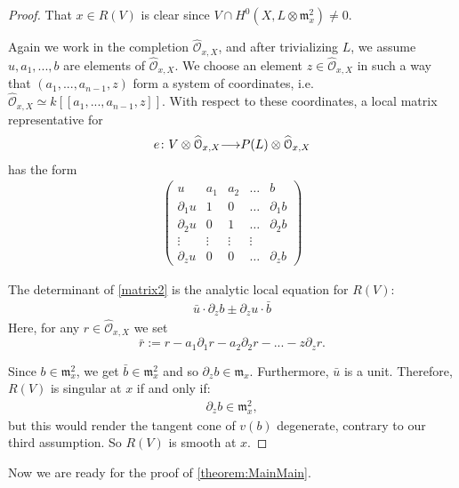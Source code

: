 \documentclass[11pt,reqno]{amsart}
\theoremstyle{plain}
\theoremstyle{definition}
\theoremstyle{remark}
\numberwithin{equation}{section}
\newcommand{\cO}{{\mathcal O}}
\renewcommand{\to}{{\longrightarrow}}
\numberwithin{equation}{section}
\begin{document}
\begin{proof}
  That $x \in R(V)$ is clear since $V \cap H^{0}(X,L \otimes \mathfrak{m}^{2}_{x}) \neq 0 $.

  Again we work in the completion $\widehat{\cO}_{x,X}$, and after trivializing $L$, we assume $u, a_{1}, ..., b$ are elements of $\widehat{\cO}_{x,X}$. We choose an element $z \in \widehat{\cO}_{x,X}$ in such a way that $(a_{1}, ..., a_{n-1}, z)$ form a system of coordinates, i.e. $\widehat{\cO}_{x,X} \simeq k[[a_{1}, ..., a_{n-1}, z ]]$.  With respect to these coordinates, a local matrix representative for \begin{align*}
  e\from V \otimes \widehat{\cO}_{x,X} \to P(L) \otimes \widehat{\cO}_{x,X}
\end{align*}
has the form
\begin{align}\label{matrix2}
\begin{pmatrix}
  u & a_{1} & a_{2} & \dots & b \\
  \partial_{1}u & 1 & 0 & \dots & \partial_{1}b \\
  \partial_{2}u & 0 & 1 & \dots & \partial_{2}b \\
  \vdots & \vdots & \vdots & \vdots \\
  \partial_{z}u  & 0 & 0 & \dots & \partial_{z}b
\end{pmatrix}
\end{align}

The determinant of \ref{matrix2} is the analytic local equation for $R(V)$: 
\begin{align*}
   \bar{u} \cdot \partial_{z}b \pm \partial_{z}u \cdot \bar{b}
 \end{align*} 
 Here, for any $r \in \widehat{\cO}_{x,X}$ we set $$\bar{r} := r - a_{1}\partial_{1}r - a_{2}\partial_{2}r - ... - z \partial_{z} r.$$

 Since $b \in {\mathfrak m}^{2}_{x}$, we get $\bar{b} \in {\mathfrak m}^{2}_{x}$ and so $\partial_{z}b \in {\mathfrak m}_{x}$.  Furthermore, $\bar{u}$ is a unit.  Therefore,  $R(V)$ is singular at $x$ if and only if: 
 \begin{align*}
  \partial_{z}b \in {\mathfrak m}^{2}_{x},
 \end{align*}
 but this would render the tangent cone of $v(b)$ degenerate, contrary to our third assumption. So $R(V)$ is smooth at $x$.
\end{proof}

Now we are ready for the proof of \autoref{theorem:MainMain}. 
\end{document}
